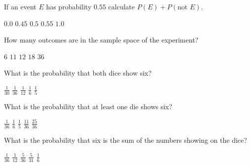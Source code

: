 \documentclass[answers,12pt]{exam}
\begin{document}
\begin{questions}
\question If an event $E$ has probability $0.55$
calculate $P\left(E\right)+P\left(\text{not $E$}\right)$.\\
\begin{oneparchoices}
\choice $0.0$
\choice $0.45$
\choice $0.5$
\choice $0.55$
\correctchoice $1.0$
\end{oneparchoices}


\question\label{FirstDice}
How many outcomes are in the sample space of the experiment?\\
\begin{oneparchoices}
\choice $6$ %
\choice $11$ %
\choice $12$ %
\choice $18$
\correctchoice $36$
\end{oneparchoices}

\question What is the probability that both dice show six?\\
\begin{oneparchoices}
\choice $\frac{1}{30}$ %
\correctchoice $\frac{1}{36}$
\choice $\frac{1}{12}$ %
\choice $\frac{1}{6}$
\choice $\frac{1}{5}$ %
\end{oneparchoices}

\question
What is the probability that at least one die shows six?\\
\begin{oneparchoices}
\choice $\frac{1}{36}$
\choice $\frac{1}{6}$
\choice $\frac{1}{5}$ %
\correctchoice $\frac{11}{36}$
\choice $\frac{25}{36}$ %
\end{oneparchoices}

\question\label{LastDice}
What is the probability that six is the sum of the numbers
showing on the dice?
\begin{oneparchoices}
\choice $\frac{1}{36}$
\choice $\frac{1}{12}$ %
\correctchoice $\frac{5}{36}$
\choice $\frac{5}{31}$ %
\choice $\frac{1}{6}$
\end{oneparchoices}




\end{questions}
\end{document}
